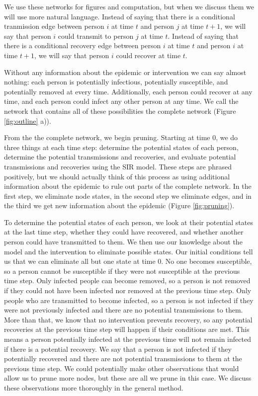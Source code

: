 \documentclass[PTRSB]{rsos}
\begin{document}
We use these networks for figures and computation, but when we discuss them we will use more natural language.
Instead of saying that there is a conditional tranmission edge between person $i$ at time $t$ and person $j$ at time $t+1$, we will say that person $i$ could transmit to person $j$ at time $t$.
Instead of saying that there is a conditional recovery edge between person $i$ at time $t$ and person $i$ at time $t+1$, we will say that person $i$ could recover at time $t$.

Without any information about the epidemic or intervention we can say almost nothing: each person is potentially infectious, potentially susceptible, and potentially removed at every time.
Additionally, each person could recover at any time, and each person could infect any other person at any time.
We call the network that contains all of these possibilities the complete network (Figure \ref{fig:outline} a)).

From the the complete network, we begin pruning.
Starting at time $0$, we do three things at each time step: determine the potential states of each person, determine the potential transmissions and recoveries, and evaluate potential transmissions and recoveries using the SIR model.
These steps are phrased positively, but we should actually think of this process as using additional information about the epidemic to rule out parts of the complete network.
In the first step, we eliminate node states, in the second step we eliminate edges, and in the third we get new information about the epidemic (Figure \ref{fig:pruning}).

To determine the potential states of each person, we look at their potential states at the last time step, whether they could have recovered, and whether another person could have transmitted to them.
We then use our knowledge about the model and the intervention to eliminate possible states.
Our initial conditions tell us that we can eliminate all but one state at time $0$.
No one becomes susceptible, so a person cannot be susceptible if they were not susceptible at the previous time step.
Only infected people can become removed, so a person is not removed if they could not have been infected nor removed at the previous time step.
Only people who are transmitted to become infected, so a person is not infected if they were not previously infected and there are no potential transmissions to them.
More than that, we know that no intervention prevents recovery, so any potential recoveries at the previous time step will happen if their conditions are met.
This means a person potentially infected at the previous time will not remain infected if there is a potential recovery.
We say that a person is not infected if they potentially recovered and there are not potential transmissions to them at the previous time step.
We could potentially make other observations that would allow us to prune more nodes, but these are all we prune in this case.
We discuss these observations more thoroughly in the general method.
\end{document}
